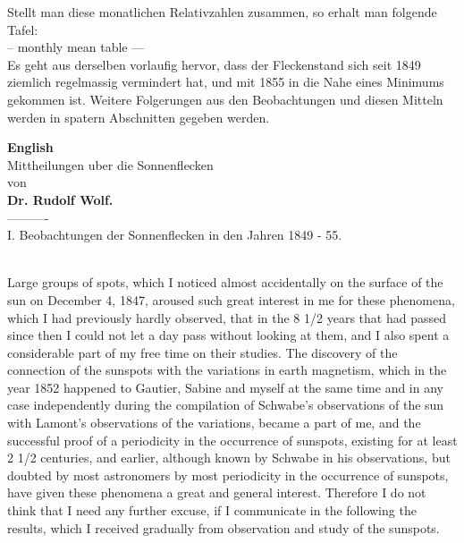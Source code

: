 \documentclass[12pt]{article}
\begin{document}
Stellt man diese monatlichen Relativzahlen zusammen, so erhalt man folgende Tafel:\\

-- monthly mean table ---\\

Es geht aus derselben vorlaufig hervor, dass der Fleckenstand sich seit 1849 ziemlich regelmassig vermindert hat, und mit 1855 in die Nahe eines Minimums gekommen ist. Weitere Folgerungen aus den Beobachtungen und diesen Mitteln werden in spatern Abschnitten gegeben werden.\\




{\centering
\textbf{English}\\
\huge{Mittheilungen uber die Sonnenflecken}\\
\footnotesize{von}\\
\textbf{Dr. Rudolf Wolf.}\\
----------\\
\footnotesize{I. Beobachtungen der Sonnenflecken in den Jahren 1849 - 55.}
\par
}\\
Large groups of spots, which I noticed almost accidentally on the surface of the sun on December 4, 1847, aroused such great interest in me for these phenomena, which I had previously hardly observed, that in the 8 1/2 years that had passed since then I could not let a day pass without looking at them, and I also spent a considerable part of my free time on their studies. The discovery of the connection of the sunspots with the variations in earth magnetism, which in the year 1852 happened to Gautier, Sabine and myself at the same time and in any case independently during the compilation of Schwabe's observations of the sun with Lamont's observations of the variations, became a part of me, and the successful proof of a periodicity in the occurrence of sunspots, existing for at least 2 1/2 centuries, and earlier, although known by Schwabe in his observations, but doubted by most astronomers by most periodicity in the occurrence of sunspots, have given these phenomena a great and general interest. Therefore I do not think that I need any further excuse, if I communicate in the following the results, which I received gradually from observation and study of the sunspots. \\
\end{document}
